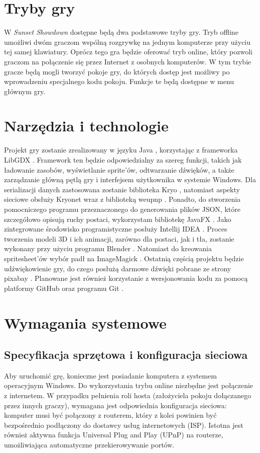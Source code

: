 \section{Tryby gry}
W \emph{Sunset Showdown} dostępne będą dwa podstawowe tryby gry. Tryb offline umożliwi dwóm graczom wspólną rozgrywkę na jednym komputerze przy użyciu tej samej klawiatury. Oprócz tego gra będzie oferować tryb online, który pozwoli graczom na połączenie się przez Internet z osobnych komputerów. W tym trybie gracze będą mogli tworzyć pokoje gry, do których dostęp jest możliwy po wprowadzeniu specjalnego kodu pokoju. Funkcje te będą dostępne w menu głównym gry.

\section{Narzędzia i technologie}
Projekt gry zostanie zrealizowany w języku Java \cite{Java}, korzystając z frameworka LibGDX \cite{LibGDX}. Framework ten będzie odpowiedzialny za szereg funkcji, takich jak ładowanie zasobów, wyświetlanie sprite'ów, odtwarzanie dźwięków, a także zarządzanie główną pętlą gry i interfejsem użytkownika w systemie Windows. Dla serializacji danych zastosowana zostanie biblioteka Kryo \cite{Kryo}, natomiast aspekty sieciowe obsłuży Kryonet \cite{Kryonet} wraz z biblioteką weupnp \cite{weupnp}. Ponadto, do stworzenia pomocniczego programu przeznaczonego do generowania plików JSON, które szczegółowo opisują ruchy postaci, wykorzystam bibliotekę JavaFX \cite{JavaFX}. Jako zintegrowane środowisko programistyczne posłuży Intellij IDEA \cite{IntellijIDEA}. Proces tworzenia modeli 3D i ich animacji, zarówno dla postaci, jak i tła, zostanie wykonany przy użyciu programu Blender \cite{Blender}. Natomiast do kreowania spritesheet'ów wybór padł na ImageMagick \cite{ImageMagick}. Ostatnią częścią projektu będzie udźwiękowienie gry, do czego posłużą darmowe dźwięki pobrane ze strony pixabay \cite{Pixabay}. Planowane jest również korzystanie z wersjonowania kodu za pomocą platformy GitHub \cite{GitHub} oraz programu Git \cite{Git}.

\section{Wymagania systemowe}
\subsection{Specyfikacja sprzętowa i konfiguracja sieciowa}
Aby uruchomić grę, konieczne jest posiadanie komputera z systemem operacyjnym Windows. Do wykorzystania trybu online niezbędne jest połączenie z internetem. W przypadku pełnienia roli hosta (założyciela pokoju dołączanego przez innych graczy), wymagana jest odpowiednia konfiguracja sieciowa: komputer musi być połączony z routerem, który z kolei powinien być bezpośrednio podłączony do dostawcy usług internetowych (ISP). Istotna jest również aktywna funkcja Universal Plug and Play (UPnP) na routerze, umożliwiająca automatyczne przekierowywanie portów.

